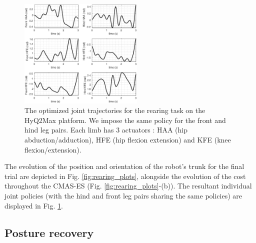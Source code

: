\documentclass[usletter, 10pt, conference]{ieeeconf}      %
\begin{document}
\begin{figure}[h!]
 \centering
 \vspace*{-3mm}
 \hspace*{-5mm}
    \centering
  \includegraphics[width=0.53\textwidth]{rearing_GaussSol_1_ICRA_e.eps}
 \caption{The optimized joint trajectories for the rearing task on the HyQ2Max 
platform. We impose the same policy for the front and hind leg pairs. 
Each limb has 3 actuators : HAA (hip abduction/adduction), HFE (hip flexion extension) and KFE (knee 
flexion/extension).}
   \vspace*{-4mm}
  \label{fig:rearing_gauss}
\end{figure}

The evolution of the position and orientation of the robot's trunk for the 
final trial are depicted in Fig. \ref{fig:rearing_plots}, alongside the evolution 
of the cost throughout the CMAS-ES (Fig. \ref{fig:rearing_plots}-(b)). 
The resultant individual joint policies (with the hind and front leg pairs sharing the
same policies) are displayed in Fig. \ref{fig:rearing_gauss}.


\subsection{Posture recovery}
\end{document}
